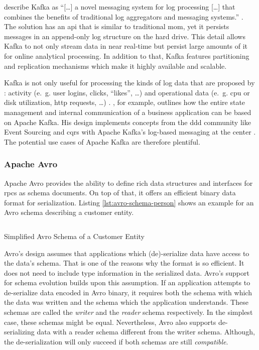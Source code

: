 \citeauthor{kreps_kafka_2011} describe Kafka as \enquote{[\ldots] a novel messaging system for log processing [\ldots] that combines the benefits of traditional log aggregators and messaging systems.} \parencite{kreps_kafka_2011}.
The solution has an \gls{api} that is similar to traditional \gls{mom}, yet it persists messages in an append-only log structure on the hard drive.
This detail allows Kafka to not only stream data in near real-time but persist large amounts of it for online analytical processing.
In addition to that, Kafka features partitioning and replication mechanisms which make it highly available and scalable. \parencite{kreps_kafka_2011}

Kafka is not only useful for processing the kinds of log data that are proposed by \citeauthor{kreps_kafka_2011}: activity (e.~g. user logins, clicks, \enquote{likes}, \ldots) and operational data (e.~g. \gls{cpu} or disk utilization, \gls{http} requests, \ldots) \parencite{kreps_kafka_2011}.
\citeauthor{stopford_designing_2018}, for example, outlines how the entire state management and internal communication of a business application can be based on Apache Kafka.
His design implements concepts from the \gls{ddd} community like Event Sourcing \parencite{fowler_event_sourcing_2005} and \gls{cqrs} \parencite{fowler_cqrs_2011} with Apache Kafka's log-based messaging at the center \parencite{stopford_designing_2018}.
The potential use cases of Apache Kafka are therefore plentiful.

\subsubsection{Apache Avro}\label{sec:avro}

Apache Avro provides the ability to define rich data structures and interfaces for \glspl{rpc} as schema documents.
On top of that, it offers an efficient binary data format for serialization.
Listing \ref{lst:avro-schema-person} shows an example for an Avro schema describing a customer entity.
\parencite{avro}

\begin{listing}[H]
  \inputminted{json}{assets/src/Customer.avsc}
  \caption{Simplified Avro Schema of a Customer Entity}\label{lst:avro-schema-person}
\end{listing}

Avro's design assumes that applications which (de)-serialize data have access to the data's schema.
That is one of the reasons why the format is so efficient.
It does not need to include type information in the serialized data.
Avro's support for schema evolution builds upon this assumption.
If an application attempts to de-serialize data encoded in Avro binary, it requires both the schema with which the data was written and the schema which the application understands.
These schemas are called the \emph{writer} and the \emph{reader} schema respectively.
In the simplest case, these schemas might be equal.
Nevertheless, Avro also supports de-serializing data with a reader schema different from the writer schema.
Although, the de-serialization will only succeed if both schemas are still \emph{compatible}.
\parencite{avro}

